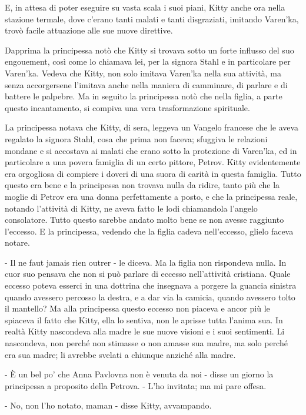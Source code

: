 E, in attesa di poter eseguire su vasta scala i suoi piani, Kitty anche ora nella stazione termale, dove c'erano tanti malati e tanti disgraziati, imitando Varen'ka, trovò facile attuazione alle sue nuove direttive. 

Dapprima la principessa notò che Kitty si trovava sotto un forte influsso del suo engouement, così come lo chiamava lei, per la signora Stahl e in particolare per Varen'ka. Vedeva che Kitty, non solo imitava Varen'ka nella sua attività, ma senza accorgersene l'imitava anche nella maniera di camminare, di parlare e di battere le palpebre. Ma in seguito la principessa notò che nella figlia, a parte questo incantamento, si compiva una vera trasformazione spirituale. 

La principessa notava che Kitty, di sera, leggeva un Vangelo francese che le aveva regalato la signora Stahl, cosa che prima non faceva; sfuggiva le relazioni mondane e si accostava ai malati che erano sotto la protezione di Varen'ka, ed in particolare a una povera famiglia di un certo pittore, Petrov. Kitty evidentemente era orgogliosa di compiere i doveri di una suora di carità in questa famiglia. Tutto questo era bene e la principessa non trovava nulla da ridire, tanto più che la moglie di Petrov era una donna perfettamente a posto, e che la principessa reale, notando l'attività di Kitty, ne aveva fatto le lodi chiamandola l'angelo consolatore. Tutto questo sarebbe andato molto bene se non avesse raggiunto l'eccesso. E la principessa, vedendo che la figlia cadeva nell'eccesso, glielo faceva notare. 

- Il ne faut jamais rien outrer - le diceva. Ma la figlia non rispondeva nulla. In cuor suo pensava che non si può parlare di eccesso nell'attività cristiana. Quale eccesso poteva esserci in una dottrina che insegnava a porgere la guancia sinistra quando avessero percosso la destra, e a dar via la camicia, quando avessero tolto il mantello? Ma alla principessa questo eccesso non piaceva e ancor più le spiaceva il fatto che Kitty, ella lo sentiva, non le aprisse tutta l'anima sua. In realtà Kitty nascondeva alla madre le sue nuove visioni e i suoi sentimenti. Li nascondeva, non perché non stimasse o non amasse sua madre, ma solo perché era sua madre; li avrebbe svelati a chiunque anziché alla madre. 

- È un bel po' che Anna Pavlovna non è venuta da noi - disse un giorno la principessa a proposito della Petrova. - L'ho invitata; ma mi pare offesa. 

- No, non l'ho notato, maman - disse Kitty, avvampando. 


